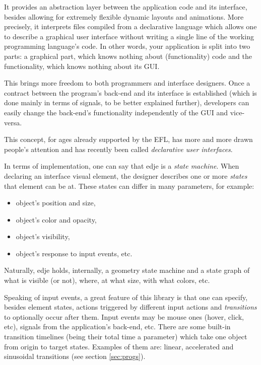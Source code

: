 \documentclass[a4paper]{profusion}
\begin{document}
It provides an abstraction layer between the application code and its
interface, besides allowing for extremely flexible dynamic layouts and
animations. More precisely, it interprets files compiled from a
declarative language which allows one to describe a graphical user
interface without writing a single line of the working programming
language's code. In other words, your application is split into two
parts: a graphical part, which knows nothing about (functionality)
code and the functionality, which knows nothing about its GUI.

This brings more freedom to both programmers and interface designers.
Once a contract between the program's back-end and its interface is
established (which is done mainly in terms of signals, to be better
explained further), developers can easily change the back-end's
functionality independently of the GUI and vice-versa.

This concept, for ages already supported by the EFL, has more and more
drawn  people's  attention  and  has  recently  been  called
\emph{declarative user interfaces}.

In terms of implementation, one can say that edje is a \emph{state
 machine}. When declaring an interface visual element, the designer
describes one or more \emph{states} that element can be at. These
states can differ in many parameters, for example:
\begin{itemize}
\item object's position and size,
\item object's color and opacity,
\item object's visibility,
\item object's response to input events, etc.
\end{itemize}

Naturally, edje holds, internally, a geometry state machine and a
state graph of what is visible (or not), where, at what size, with
what colors, etc.

Speaking of input events, a great feature of this library is that one
can specify, besides element states, actions triggered by different
input actions and \emph{transitions} to optionally occur after
them. Input events may be mouse ones (hover, click, etc), signals from
the application's back-end, etc. There are some built-in transition
timelines (being their total time a parameter) which take one object
from origin to target states.  Examples of them are: linear,
accelerated and sinusoidal transitions (see section \ref{sec:progs}).
\end{document}

